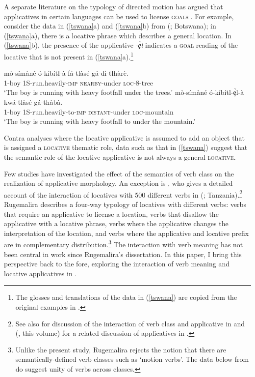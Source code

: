 \documentclass[output=paper]{langsci/langscibook}
\begin{document}
A separate literature on the typology of directed motion has argued that applicatives in certain  languages can be used to license {\scshape goals} \citep{schaefer:1985,sitoe:1996}. For example, consider the data in (\ref{tswana}a) and (\ref{tswana}b) from  (; Botswana); in (\ref{tswana}a), there is a locative phrase which describes a general location. In (\ref{tswana}b), the presence of the applicative \emph{-\c{è}l} indicates a {\scshape goal}  reading of the locative that is not present in (\ref{tswana}a).\footnote{The glosses and  translations of the data in (\ref{tswana}) are copied from the original examples in \citet{schaefer:1985}.}
\begin{exe}
	\ex\label{tswana}\begin{xlist}
		\ex  \gll mò-símàné ó-kíbítl-à fá-tlàsé gá-dì-tlhàrè.\\
			1-boy 1S-run.heavily-{\scshape imp} {\scshape nearby-}under {\scshape loc-8-}tree\\
			\glt `The boy is running with heavy footfall under the trees.'
		\ex\gll mò-símàné ó-kíbítl-\c{è}l-à kwá-tlàsé gá-thàbà.\\
			1-boy 1S-run.heavily-to-{\scshape imp} {\scshape distant}-under {\scshape loc-}mountain\\
			\glt `The boy is running with heavy footfall to under the mountain.'  \citep[Tables VI-VII]{schaefer:1985}
	\end{xlist}
\end{exe}
%
Contra analyses where the locative applicative is assumed to add an object that is assigned a {\scshape locative} thematic role, data such as that in (\ref{tswana}) suggest that the semantic role of the locative applicative is not always a general {\scshape locative}.

Few studies have investigated the effect of the semantics of verb class on the realization of applicative morphology. An exception is \citet{rugemalira:1993}, who gives a detailed account of the interaction of locatives with 500 different verbs in  (; Tanzania).\footnote{See also \citet{CannMabugu2007} for discussion of the interaction of verb class and applicative in  and \citeauthor{sibanda:2016} (\citeyear*{sibanda:2016}, this volume) for a related discussion of applicatives in .} Rugemalira describes a four-way typology of locatives with different verbs: verbs that require an applicative to license a location, verbs that disallow the applicative with a locative phrase, verbs where the applicative changes the interpretation of the location, and verbs where the applicative and locative prefix are in complementary distribution.\footnote{Unlike the present study, Rugemalira rejects the notion that there are semantically-defined verb classes such as `motion verbs'. The data below from  do suggest unity of verbs across classes.}
The interaction with verb meaning has not been central in work since Rugemalira's dissertation. In this paper, I bring this perspective back to the fore, exploring the interaction of verb meaning and locative applicatives in .
\end{document}
